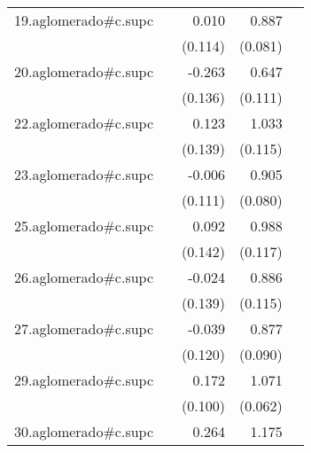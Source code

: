 {\begin{longtable}{l*{4}{D{.}{.}{-1}}}
\addlinespace
19.aglomerado#c.supc&                     &       0.010         &       0.887\sym{***}&                     \\
            &                     &     (0.114)         &     (0.081)         &                     \\
\addlinespace
20.aglomerado#c.supc&                     &      -0.263         &       0.647\sym{***}&                     \\
            &                     &     (0.136)         &     (0.111)         &                     \\
\addlinespace
22.aglomerado#c.supc&                     &       0.123         &       1.033\sym{***}&                     \\
            &                     &     (0.139)         &     (0.115)         &                     \\
\addlinespace
23.aglomerado#c.supc&                     &      -0.006         &       0.905\sym{***}&                     \\
            &                     &     (0.111)         &     (0.080)         &                     \\
\addlinespace
25.aglomerado#c.supc&                     &       0.092         &       0.988\sym{***}&                     \\
            &                     &     (0.142)         &     (0.117)         &                     \\
\addlinespace
26.aglomerado#c.supc&                     &      -0.024         &       0.886\sym{***}&                     \\
            &                     &     (0.139)         &     (0.115)         &                     \\
\addlinespace
27.aglomerado#c.supc&                     &      -0.039         &       0.877\sym{***}&                     \\
            &                     &     (0.120)         &     (0.090)         &                     \\
\addlinespace
29.aglomerado#c.supc&                     &       0.172         &       1.071\sym{***}&                     \\
            &                     &     (0.100)         &     (0.062)         &                     \\
\addlinespace
30.aglomerado#c.supc&                     &       0.264         &       1.175\sym{***}&                     \\

\end{longtable}}
